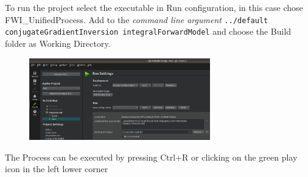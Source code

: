 \documentclass[10pt]{article}
\begin{document}
To run the project select the executable in Run configuration, in this case chose FWI\_UnifiedProcess. 
Add to the \textit{command line argument} \texttt{../default conjugateGradientInversion integralForwardModel} and choose the Build folder as Working Directory.

\begin{figure}[h!]
\includegraphics[width = 0.7\textwidth]{DocumentationQT_RunUnifiedProcess}
\end{figure}

The Process can be executed by pressing Ctrl+R or clicking on the green play icon in the left lower corner
\end{document}
